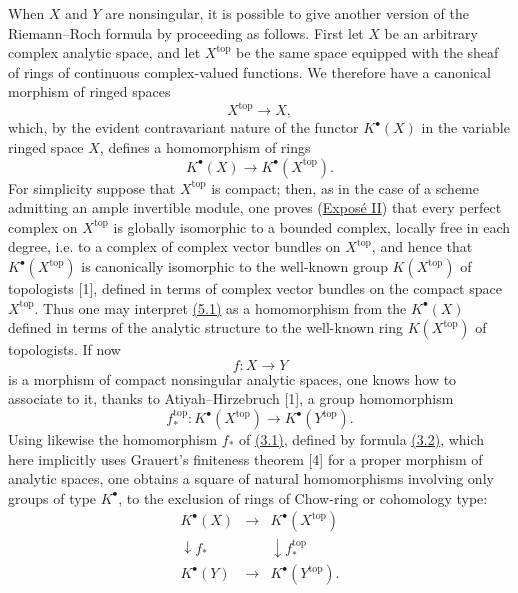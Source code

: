 When $X$ and $Y$ are nonsingular, it is possible to give another version of the Riemann--Roch formula by proceeding as follows. First let $X$ be an arbitrary complex analytic space, and let $X^{\mathrm{top}}$ be the same space equipped with the sheaf of rings of continuous complex-valued functions. We therefore have a canonical morphism of ringed spaces
\[
X^{\mathrm{top}}\longrightarrow X,
\]
which, by the evident contravariant nature of the functor $K^\bullet(X)$ in the variable ringed space $X$, defines a homomorphism of rings
\begin{equation}\tag{5.1}
K^\bullet(X)\longrightarrow K^\bullet(X^{\mathrm{top}}).
\end{equation}
For simplicity suppose that $X^{\mathrm{top}}$ is compact; then, as in the case of a scheme admitting an ample invertible module, one proves (\hyperlink{sga6.e02.expose}{Expos\'e II}) that every perfect complex on $X^{\mathrm{top}}$ is globally isomorphic to a bounded complex, locally free in each degree, i.e. to a complex of complex vector bundles on $X^{\mathrm{top}}$, and hence that $K^\bullet(X^{\mathrm{top}})$ is canonically isomorphic to the well-known group $K(X^{\mathrm{top}})$ of topologists [1], defined in terms of complex vector bundles on the compact space $X^{\mathrm{top}}$. Thus one may interpret \hyperlink{sga6.e00.eq.5-1}{(5.1)} as a homomorphism from the $K^\bullet(X)$ defined in terms of the analytic structure to the well-known ring $K(X^{\mathrm{top}})$ of topologists. If now
\[
f:X\longrightarrow Y
\]
is a morphism of compact nonsingular analytic spaces, one knows how to associate to it, thanks to Atiyah--Hirzebruch [1], a group homomorphism
\begin{equation}\tag{5.2}
f^{\mathrm{top}}_*:K^\bullet(X^{\mathrm{top}})\longrightarrow K^\bullet(Y^{\mathrm{top}}).
\end{equation}
Using likewise the homomorphism $f_*$ of \hyperlink{sga6.e00.eq.3-1}{(3.1)}, defined by formula \hyperlink{sga6.e00.sec.3.2}{(3.2)}, which here implicitly uses Grauert's finiteness theorem [4] for a proper morphism of analytic spaces, one obtains a square of natural homomorphisms involving only groups of type $K^\bullet$, to the exclusion of rings of Chow-ring or cohomology type:
\begin{equation}\tag{5.3}
\begin{array}{ccc}
K^\bullet(X) & \longrightarrow & K^\bullet(X^{\mathrm{top}}) \\
\downarrow f_* && \downarrow f^{\mathrm{top}}_* \\
K^\bullet(Y) & \longrightarrow & K^\bullet(Y^{\mathrm{top}}).
\end{array}
\end{equation}
